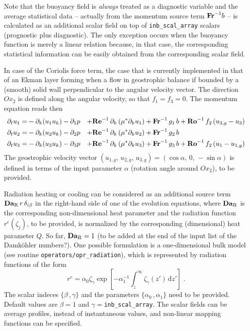Note that the buoyancy field is {\it always} treated as a diagnostic variable and the average statistical data -- actually from the momentum source term $\mathrm{\bf Fr}^{-1}b$ -- is calculated as an additional scalar field on top of {\tt   inb\_scal\_array} scalars (prognostic plus diagnostic). The only exception occurs when the buoyancy function is merely a linear relation because, in that case, the corresponding statistical information can be easily obtained from the corresponding scalar field.

In case of the Coriolis force term, the case that is currently implemented in that of an Ekman layer forming when a flow in geostrophic balance if bounded by a (smooth) solid wall perpendicular to the angular velocity vector. The direction $Ox_2$ is defined along the angular velocity, so that $f_1=f_3=0$. The momentum equation reads then
\begin{subequations}
  \begin{align}
    \partial_t  u_1 =& -\partial_k ( u_1 u_k ) -\partial_1 p &
    +\mathrm{\bf Re}^{-1}\,\partial_k  \left( \mu^{*} \partial_k u_1\right) &
    +\mathrm{\bf Fr}^{-1}\, g_1\,b +\mathrm{\bf Ro}^{-1}\,f_2\,(u_{3,g}-u_3) \\
    \partial_t  u_2 =& -\partial_k ( u_2 u_k ) -\partial_2 p &
    +\mathrm{\bf Re}^{-1}\,\partial_k  \left( \mu^{*} \partial_k u_2\right) &
    +\mathrm{\bf Fr}^{-1}\, g_2\,b \\
    \partial_t  u_3 =& -\partial_k ( u_3 u_k ) -\partial_3 p &
    +\mathrm{\bf Re}^{-1}\,\partial_k  \left( \mu^{*} \partial_k u_3\right) &
    +\mathrm{\bf Fr}^{-1}\, g_3\,b +\mathrm{\bf Ro}^{-1}\,f_2\,(u_1-u_{1,g})
  \end{align}
\end{subequations}
The geostrophic velocity vector $(u_{1,g},\,u_{2,g},\,u_{3,g}) = (\cos\alpha,\,0,\,-\sin\alpha)$ is defined in terms of the input parameter $\alpha$ (rotation angle around $Ox_2$), to be provided.

Radiation heating or cooling can be considered as an additional source term $\mathrm{\bf Da}_\mathrm{R}\,r\,\delta_{i\beta}$ in the right-hand side of one of the evolution equations, where $\mathrm{\bf Da}_\mathrm{R}$ is the corresponding non-dimensional heat parameter and the radiation function $r^e(\zeta_j)$, to be provided, is normalized by the corresponding (dimensional) heat parameter $Q$. So far, $\mathrm{\bf Da}_\mathrm{R}=1$ (to be added at the end of the input list of the Damk{\"o}hler numbers?). One possible formulation is a one-dimensional bulk model (see routine {\tt operators/opr\_radiation}), which is represented by radiation functions of the form
\begin{equation}
  r^e=\alpha_0 \zeta_{\gamma}\exp\left[
  -\alpha_1^{-1}\int_z^\infty\zeta_{\gamma}(z')\,\mathrm{d}z'\right] \;.
\end{equation}
The scalar indeces $\{\beta\,,\gamma\}$ and the parameters $\{\alpha_0\,,\alpha_1\}$ need to be provided. Default values are $\beta=1$ and $\gamma=${\tt inb\_scal\_array}. The scalar fields can be average profiles, instead of instantaneous values, and non-linear mapping functions can be specified.

